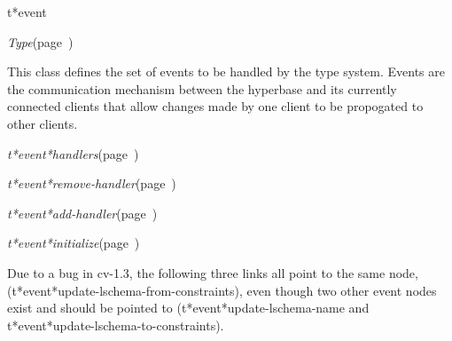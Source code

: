 \begin{description}
\item [Name:]  t*event

\item [Layer:] {\sl Type}\hfill(page~\pageref{Type})

\item [Description:]

This class defines the set of events to be handled
by the type system.  Events are the communication
mechanism between the hyperbase and its currently
connected clients that allow changes made by one
client to be propogated to other clients. 

\item [Attributes:]
\item {\sl t*event*handlers}\hfill(page~\pageref{t*event*handlers})


\item [Operations:]
\item {\sl t*event*remove-handler}\hfill(page~\pageref{t*event*remove-handler})
\item {\sl t*event*add-handler}\hfill(page~\pageref{t*event*add-handler})
\item {\sl t*event*initialize}\hfill(page~\pageref{t*event*initialize})

\item [Subclasses:]

\item [Superclasses:]

\item [Instances:]
Due to a bug in cv-1.3, the following three links
all point to the same node,
(t*event*update-lschema-from-constraints),
even though two other event nodes exist and should
be pointed to (t*event*update-lschema-name and 
t*event*update-lschema-to-constraints). 


\end{description}
